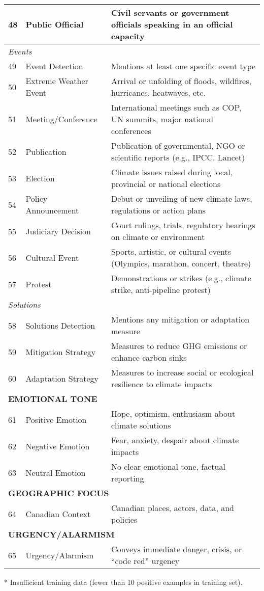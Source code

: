 \documentclass[12pt]{article}
\begin{document}
{\begin{longtable}{p{0.5cm}p{5cm}p{16cm}}
48 & Public Official & Civil servants or government officials speaking in an official capacity \\
\midrule
\multicolumn{3}{l}{\textit{Events}} \\
49 & Event Detection & Mentions at least one specific event type \\
50 & Extreme Weather Event & Arrival or unfolding of floods, wildfires, hurricanes, heatwaves, etc. \\
51 & Meeting/Conference & International meetings such as COP, UN summits, major national conferences \\
52 & Publication & Publication of governmental, NGO or scientific reports (e.g., IPCC, Lancet) \\
53 & Election & Climate issues raised during local, provincial or national elections \\
54 & Policy Announcement & Debut or unveiling of new climate laws, regulations or action plans \\
55 & Judiciary Decision & Court rulings, trials, regulatory hearings on climate or environment \\
56 & Cultural Event & Sports, artistic, or cultural events (Olympics, marathon, concert, theatre) \\
57 & Protest & Demonstrations or strikes (e.g., climate strike, anti-pipeline protest) \\
\midrule
\multicolumn{3}{l}{\textit{Solutions}} \\
58 & Solutions Detection & Mentions any mitigation or adaptation measure \\
59 & Mitigation Strategy & Measures to reduce GHG emissions or enhance carbon sinks \\
60 & Adaptation Strategy & Measures to increase social or ecological resilience to climate impacts \\
\midrule
\multicolumn{3}{l}{\cellcolor{gray!10}\textbf{EMOTIONAL TONE}} \\
61 & Positive Emotion & Hope, optimism, enthusiasm about climate solutions \\
62 & Negative Emotion & Fear, anxiety, despair about climate impacts \\
63 & Neutral Emotion & No clear emotional tone, factual reporting \\
\midrule
\multicolumn{3}{l}{\cellcolor{gray!10}\textbf{GEOGRAPHIC FOCUS}} \\
64 & Canadian Context & Canadian places, actors, data, and policies \\
\midrule
\multicolumn{3}{l}{\cellcolor{gray!10}\textbf{URGENCY/ALARMISM}} \\
65 & Urgency/Alarmism & Conveys immediate danger, crisis, or ``code red'' urgency \\
\bottomrule
\end{longtable}
\vspace{0.5em}
\noindent\footnotesize
* Insufficient training data (fewer than 10 positive examples in training set).
} %
\end{document}
